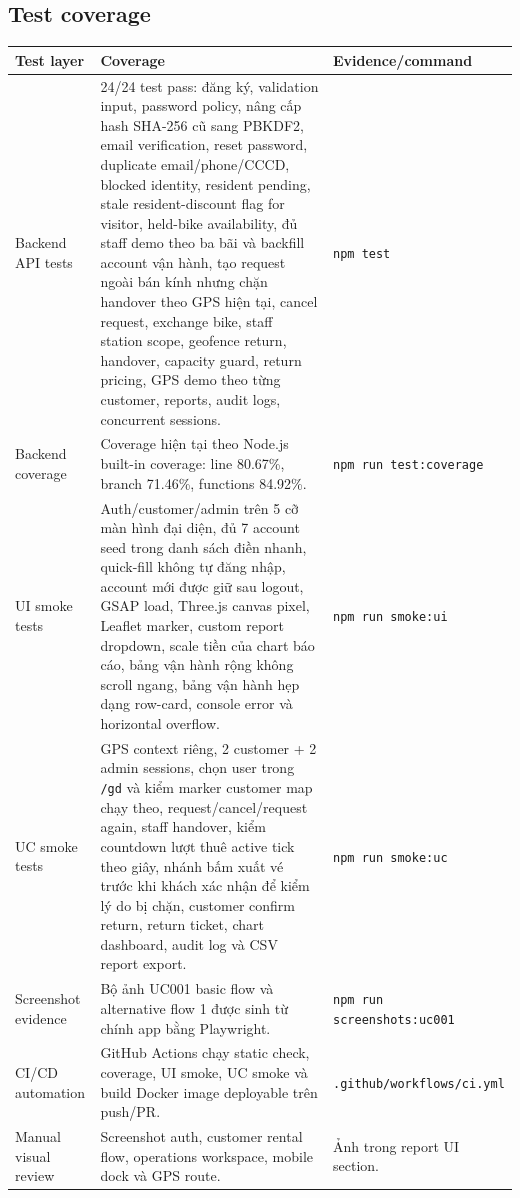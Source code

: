 \subsection{Test coverage}
\begin{longtable}{P{0.24\textwidth}P{0.36\textwidth}P{0.30\textwidth}}
\toprule
\textbf{Test layer} & \textbf{Coverage} & \textbf{Evidence/command} \\
\midrule
Backend API tests & 24/24 test pass: đăng ký, validation input, password policy, nâng cấp hash SHA-256 cũ sang PBKDF2, email verification, reset password, duplicate email/phone/CCCD, blocked identity, resident pending, stale resident-discount flag for visitor, held-bike availability, đủ staff demo theo ba bãi và backfill account vận hành, tạo request ngoài bán kính nhưng chặn handover theo GPS hiện tại, cancel request, exchange bike, staff station scope, geofence return, handover, capacity guard, return pricing, GPS demo theo từng customer, reports, audit logs, concurrent sessions. & \texttt{npm test} \\
Backend coverage & Coverage hiện tại theo Node.js built-in coverage: line 80.67\%, branch 71.46\%, functions 84.92\%. & \texttt{npm run test:coverage} \\
UI smoke tests & Auth/customer/admin trên 5 cỡ màn hình đại diện, đủ 7 account seed trong danh sách điền nhanh, quick-fill không tự đăng nhập, account mới được giữ sau logout, GSAP load, Three.js canvas pixel, Leaflet marker, custom report dropdown, scale tiền của chart báo cáo, bảng vận hành rộng không scroll ngang, bảng vận hành hẹp dạng row-card, console error và horizontal overflow. & \texttt{npm run smoke:ui} \\
UC smoke tests & GPS context riêng, 2 customer + 2 admin sessions, chọn user trong \texttt{/gd} và kiểm marker customer map chạy theo, request/cancel/request again, staff handover, kiểm countdown lượt thuê active tick theo giây, nhánh bấm xuất vé trước khi khách xác nhận để kiểm lý do bị chặn, customer confirm return, return ticket, chart dashboard, audit log và CSV report export. & \texttt{npm run smoke:uc} \\
Screenshot evidence & Bộ ảnh UC001 basic flow và alternative flow 1 được sinh từ chính app bằng Playwright. & \texttt{npm run screenshots:uc001} \\
CI/CD automation & GitHub Actions chạy static check, coverage, UI smoke, UC smoke và build Docker image deployable trên push/PR. & \texttt{.github/workflows/ci.yml} \\
Manual visual review & Screenshot auth, customer rental flow, operations workspace, mobile dock và GPS route. & Ảnh trong report UI section. \\
\bottomrule
\end{longtable}

